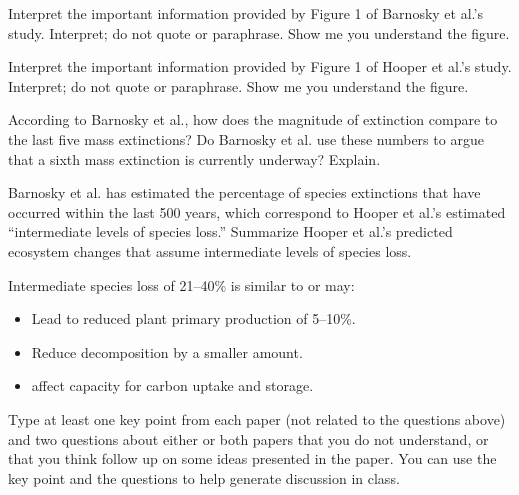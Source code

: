 \documentclass[11pt, addpoints]{exam}
\begin{document}
\begin{questions}

\question[5]
 Interpret the important information provided by Figure 1 of Barnosky et 
  al.'s study. Interpret; do not quote or paraphrase. Show me you
  understand the figure.

\question[5]
Interpret the important information provided by Figure 1 of Hooper et
  al.'s study. Interpret; do not quote or paraphrase. Show me you
  understand the figure.
  

\question[5]
According to Barnosky et al., how does the magnitude of extinction compare to the last five mass extinctions? Do
  Barnosky et al. use these numbers to argue that a sixth mass
  extinction is currently underway? Explain.


\question[10]
Barnosky et al. has estimated the percentage of species extinctions
  that have occurred within the last 500 years, which correspond to
  Hooper et al.'s estimated ``intermediate levels of species loss.''
  Summarize Hooper et al.'s predicted ecosystem changes that assume
  intermediate levels of species loss.

\ifprintanswers\begin{solution}
Intermediate species loss of 21--40\% is similar to or may:

\begin{itemize}
	\item Lead to reduced plant primary production of 5--10\%.

	\item Reduce decomposition by a smaller amount.

	\item affect capacity for carbon uptake and storage.
\end{itemize}
\end{solution}
\else
\fi

\question[5]
Type at least one key point from each paper (not related to the
  questions above) and two questions about either or both papers that
  you do not understand, or that you think follow up on some ideas
  presented in the paper. You can use the key point and the questions to
  help generate discussion in class. 


\end{questions}
\end{document}
